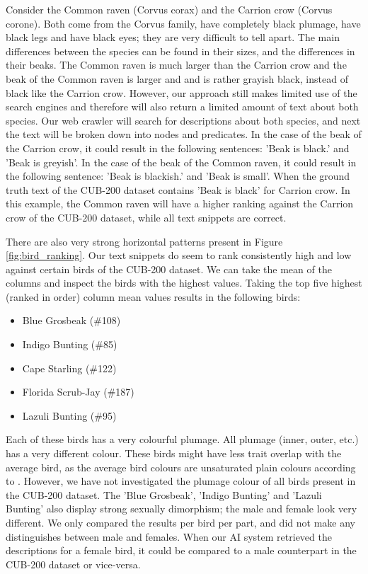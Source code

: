 \documentclass[a4paper, 12pt, oneside]{book} %
\begin{document}
Consider the Common raven (Corvus corax) and the Carrion crow (Corvus corone).
Both come from the Corvus family, have completely black plumage, have black legs and have black eyes; they are very difficult to tell apart.
The main differences between the species can be found in their sizes, and the differences in their beaks.
The Common raven is much larger than the Carrion crow and the beak of the Common raven is larger and and is rather grayish black, instead of black like the Carrion crow.
However, our approach still makes limited use of the search engines and therefore will also return a limited amount of text about both species.
Our web crawler will search for descriptions about both species, and next  the text will be broken down into nodes and predicates.
In the case of the beak of the Carrion crow, it could result in the following sentences: 'Beak is black.' and 'Beak is greyish'.
In the case of the beak of the Common raven, it could result in the following sentence: 'Beak is blackish.' and 'Beak is small'.
When the ground truth text of the CUB-200 dataset contains 'Beak is black' for Carrion crow.
In this example, the Common raven will have a higher ranking against the Carrion crow of the CUB-200 dataset, while all text snippets are correct.

There are also very strong horizontal patterns present in Figure \ref{fig:bird_ranking}.
Our text snippets do seem to rank consistently high and low against certain birds of the CUB-200 dataset.
We can take the mean of the columns and inspect the birds with the highest values.
Taking the top five highest (ranked in order) column mean values results in the following birds: 
\begin{itemize}
    \setlength\itemsep{-0.25em}
    \item Blue Grosbeak (\#108)
    \item Indigo Bunting (\#85)
    \item Cape Starling (\#122)
    \item Florida Scrub-Jay (\#187)
    \item Lazuli Bunting (\#95)
\end{itemize}
Each of these birds has a very colourful plumage. 
All plumage (inner, outer, etc.) has a very different colour.
These birds might have less trait overlap with the average bird, as the average bird colours are unsaturated plain colours according to \textcite{delhey_colour_2016}.
However, we have not investigated the plumage colour of all birds present in the CUB-200 dataset.
The 'Blue Grosbeak', 'Indigo Bunting' and 'Lazuli Bunting' also display strong sexually dimorphism; the male and female look very different.
We only compared the results per bird per part, and did not make any distinguishes between male and females.
When our AI system retrieved the descriptions for a female bird, it could be compared to a male counterpart in the CUB-200 dataset or vice-versa.
\end{document}
